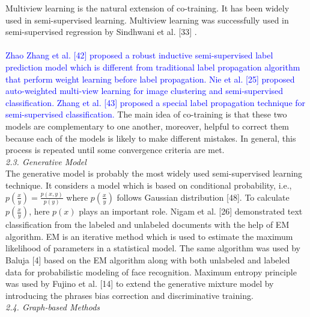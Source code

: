 \documentclass{article}
\begin{document}
		Multiview learning is the natural extension of co-training. It has been widely used in semi-supervised
		learning. Multiview learning was successfully used in semi-supervised regression by Sindhwani et al. [33] \cite{huang1995image}.\\\\
		\textcolor{blue} {Zhao Zhang et al. [42] \cite{ozkan2007upper} proposed a robust inductive semi-supervised label prediction model which is different
			from traditional label propagation algorithm that perform weight learning before label propagation. Nie et
			al. [25] \cite{cardoso1998fuzziness, flores2014fuzziness, gentili2014fuzziness} proposed auto-weighted multi-view learning for image clustering and semi-supervised classification.
			Zhang et al. [43] \cite{fisher2004helvellyn} proposed a special label propagation technique for semi-supervised classification. } The main
		idea of co-training is that these two models are complementary to one another, moreover, helpful to correct
		them because each of the models is likely to make different mistakes. In general, this process is repeated
		until some convergence criteria are met.\\[10pt]
		\textit{2.3. Generative Model}\\
		
		The generative model is probably the most widely used semi-supervised learning technique. It considers a
		model which is based on conditional probability, i.e., $p(\frac{x}{y})= \frac{p(x,y)}{p(y)}$ where $p(\frac{x}{y})$ follows Gaussian distribution [48]. To calculate $p(\frac{x}{y})$, here $p(x)$ plays an important role. Nigam et al. [26] \cite{wang1996interpretation, patwary2019impact} demonstrated text classification
		from the labeled and unlabeled documents with the help of EM algorithm. EM is an iterative method which
		is used to estimate the maximum likelihood of parameters in a statistical model. The same algorithm was
		used by Baluja [4] \cite{liang2002new} based on the EM algorithm along with both unlabeled and labeled data for probabilistic
		modeling of face recognition. Maximum entropy principle was used by Fujino et al. [14] \cite{hudec2016fuzziness} to extend the
		generative mixture model by introducing the phrases bias correction and discriminative training.\\[10pt]
		\textit{2.4. Graph-based Methods}\\
		
\end{document}
